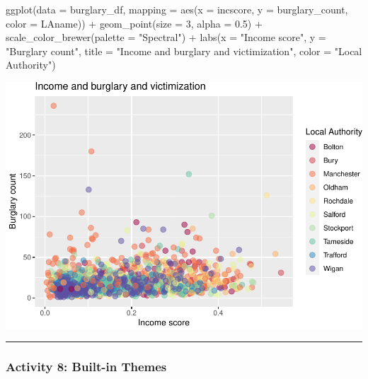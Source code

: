 \documentclass[
]{book}
\newenvironment{Shaded}{\begin{snugshade}}{\end{snugshade}}
\newcommand{\AttributeTok}[1]{\textcolor[rgb]{0.77,0.63,0.00}{#1}}
\newcommand{\DecValTok}[1]{\textcolor[rgb]{0.00,0.00,0.81}{#1}}
\newcommand{\FloatTok}[1]{\textcolor[rgb]{0.00,0.00,0.81}{#1}}
\newcommand{\FunctionTok}[1]{\textcolor[rgb]{0.00,0.00,0.00}{#1}}
\newcommand{\NormalTok}[1]{#1}
\newcommand{\SpecialCharTok}[1]{\textcolor[rgb]{0.00,0.00,0.00}{#1}}
\newcommand{\StringTok}[1]{\textcolor[rgb]{0.31,0.60,0.02}{#1}}
\begin{document}
\begin{Shaded}
\begin{Highlighting}[]
\FunctionTok{ggplot}\NormalTok{(}\AttributeTok{data =}\NormalTok{ burglary\_df, }\AttributeTok{mapping =} \FunctionTok{aes}\NormalTok{(}\AttributeTok{x =}\NormalTok{ incscore, }\AttributeTok{y =}\NormalTok{ burglary\_count, }\AttributeTok{color =}\NormalTok{ LAname)) }\SpecialCharTok{+} 
  \FunctionTok{geom\_point}\NormalTok{(}\AttributeTok{size =} \DecValTok{3}\NormalTok{, }\AttributeTok{alpha =} \FloatTok{0.5}\NormalTok{) }\SpecialCharTok{+} 
  \FunctionTok{scale\_color\_brewer}\NormalTok{(}\AttributeTok{palette =} \StringTok{"Spectral"}\NormalTok{) }\SpecialCharTok{+} 
  \FunctionTok{labs}\NormalTok{(}\AttributeTok{x =} \StringTok{"Income score"}\NormalTok{, }\AttributeTok{y =} \StringTok{"Burglary count"}\NormalTok{, }\AttributeTok{title =} \StringTok{"Income and burglary and victimization"}\NormalTok{, }\AttributeTok{color =} \StringTok{"Local Authority"}\NormalTok{)}
\end{Highlighting}
\end{Shaded}

\includegraphics{03-data-visualisation_files/figure-latex/unnamed-chunk-11-1.pdf}

\begin{center}\rule{0.5\linewidth}{0.5pt}\end{center}

\hypertarget{activity-8-built-in-themes}{%
\subsubsection{Activity 8: Built-in Themes}\label{activity-8-built-in-themes}}
\end{document}

